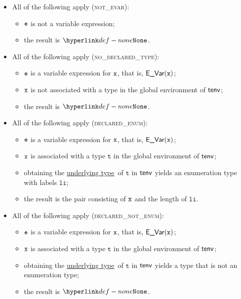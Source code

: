 \documentclass{book}
\newcommand\ProseOrTypeError[0]{\ProseTerminateAs{\TypeErrorConfig}}
\newcommand\underlyingtype[0]{\hyperlink{def-underlyingtype}{underlying type}}
\newcommand\vt[0]{\texttt{t}}
\newcommand\vli[0]{\texttt{li}}
\begin{document}
\begin{itemize}
  \item All of the following apply (\textsc{not\_evar}):
  \begin{itemize}
    \item $\texttt{e}$ is not a variable expression;
    \item the result is $\None$.
  \end{itemize}

  \item All of the following apply (\textsc{no\_declared\_type}):
  \begin{itemize}
    \item $\texttt{e}$ is a variable expression for $\texttt{x}$, that is, $\textsf{E\_Var}(\texttt{x})$;
    \item $\texttt{x}$ is not associated with a type in the global environment of $\textsf{tenv}$;
    \item the result is $\None$.
  \end{itemize}

  \item All of the following apply (\textsc{declared\_enum}):
  \begin{itemize}
    \item $\texttt{e}$ is a variable expression for $\texttt{x}$, that is, $\textsf{E\_Var}(\texttt{x})$;
    \item $\texttt{x}$ is associated with a type $\vt$ in the global environment of $\textsf{tenv}$;
    \item obtaining the \underlyingtype\ of $\vt$ in $\textsf{tenv}$ yields an enumeration type with labels $\vli$\ProseOrTypeError;
    \item the result is the pair consisting of $\texttt{x}$ and the length of $\vli$.
  \end{itemize}

  \item All of the following apply (\textsc{declared\_not\_enum}):
  \begin{itemize}
    \item $\texttt{e}$ is a variable expression for $\texttt{x}$, that is, $\textsf{E\_Var}(\texttt{x})$;
    \item $\texttt{x}$ is associated with a type $\vt$ in the global environment of $\textsf{tenv}$;
    \item obtaining the \underlyingtype\ of $\vt$ in $\textsf{tenv}$ yields a type that is not an enumeration type;
    \item the result is $\None$.
  \end{itemize}
\end{itemize}
\end{document}
